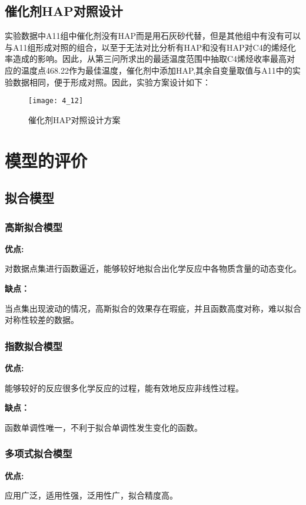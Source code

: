 \documentclass[withoutpreface,bwprint]{cumcmthesis} %
\begin{document}
\subsection{催化剂HAP对照设计}
实验数据中A11组中催化剂没有HAP而是用石灰砂代替，但是其他组中有没有可以与A11组形成对照的组合，以至于无法对比分析有HAP和没有HAP对C4的烯烃化率造成的影响。因此，从第三问所求出的最适温度范围中抽取C4烯烃收率最高对应的温度点468.22作为最佳温度，催化剂中添加HAP,其余自变量取值与A11中的实验数据相同，便于形成对照。因此，实验方案设计如下：

\begin{figure}[!h]
	\centering
	\texttt{[image: 4\_12]}
	\caption{催化剂HAP对照设计方案}
	\label{fig:circuit-diagram1}
\end{figure}




\newpage
\section{模型的评价}
\subsection{拟合模型}
\subsubsection{高斯拟合模型}
\textbf{优点:}

对数据点集进行函数逼近，能够较好地拟合出化学反应中各物质含量的动态变化。

\textbf{缺点：}

当点集出现波动的情况，高斯拟合的效果存在瑕疵，并且函数高度对称，难以拟合对称性较差的数据。

\subsubsection{指数拟合模型}
\textbf{优点:}

能够较好的反应很多化学反应的过程，能有效地反应非线性过程。

\textbf{缺点：}

函数单调性唯一，不利于拟合单调性发生变化的函数。

\subsubsection{多项式拟合模型}
\textbf{优点:}

应用广泛，适用性强，泛用性广，拟合精度高。
\end{document}
